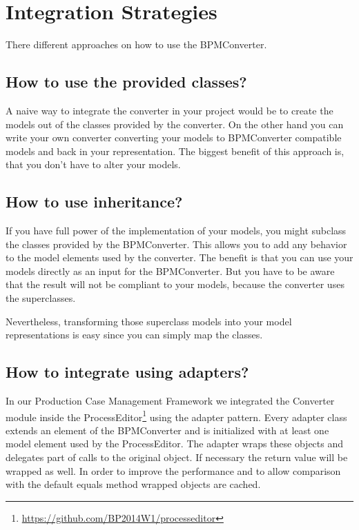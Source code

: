 \section{Integration Strategies}

There different approaches on how to use the BPMConverter.

\subsection{How to use the provided classes?}

A naive way to integrate the converter in your project would be to create the models out of the classes provided by the converter.
On the other hand you can write your own converter converting your models to BPMConverter compatible models and back in your representation.
The biggest benefit of this approach is, that you don't have to alter your models.

\subsection{How to use inheritance?}

If you have full power of the implementation of your models, you might subclass the classes provided by the BPMConverter.
This allows you to add any behavior to the model elements used by the converter.
The benefit is that you can use your models directly as an input for the BPMConverter.
But you have to be aware that the result will not be compliant to your models, because the converter uses the superclasses.

Nevertheless, transforming those superclass models into your model representations is easy since you can simply map the classes.

\subsection{How to integrate using adapters?}

In our Production Case Management Framework we integrated the Converter module inside the ProcessEditor\footnote{\url{https://github.com/BP2014W1/processeditor}} using the adapter pattern.
Every adapter class extends an element of the BPMConverter and is initialized with at least one model element used by the ProcessEditor.
The adapter wraps these objects and delegates part of calls to the original object.
If necessary the return value will be wrapped as well.
In order to improve the performance and to allow comparison with the default equals method wrapped objects are cached.